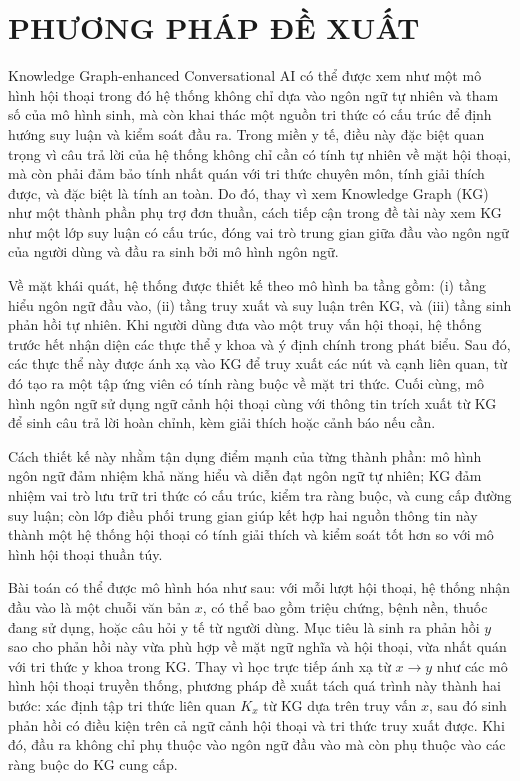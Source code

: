 \documentclass[conference]{IEEEtran}
\begin{document}
\section{PHƯƠNG PHÁP ĐỀ XUẤT}
Knowledge Graph-enhanced Conversational AI có thể được xem như một mô hình hội thoại trong đó hệ thống không chỉ dựa vào ngôn ngữ tự nhiên và tham số của mô hình sinh, mà còn khai thác một nguồn tri thức có cấu trúc để định hướng suy luận và kiểm soát đầu ra. Trong miền y tế, điều này đặc biệt quan trọng vì câu trả lời của hệ thống không chỉ cần có tính tự nhiên về mặt hội thoại, mà còn phải đảm bảo tính nhất quán với tri thức chuyên môn, tính giải thích được, và đặc biệt là tính an toàn. Do đó, thay vì xem Knowledge Graph (KG) như một thành phần phụ trợ đơn thuần, cách tiếp cận trong đề tài này xem KG như một lớp suy luận có cấu trúc, đóng vai trò trung gian giữa đầu vào ngôn ngữ của người dùng và đầu ra sinh bởi mô hình ngôn ngữ.

Về mặt khái quát, hệ thống được thiết kế theo mô hình ba tầng gồm: (i) tầng hiểu ngôn ngữ đầu vào, (ii) tầng truy xuất và suy luận trên KG, và (iii) tầng sinh phản hồi tự nhiên. Khi người dùng đưa vào một truy vấn hội thoại, hệ thống trước hết nhận diện các thực thể y khoa và ý định chính trong phát biểu. Sau đó, các thực thể này được ánh xạ vào KG để truy xuất các nút và cạnh liên quan, từ đó tạo ra một tập ứng viên có tính ràng buộc về mặt tri thức. Cuối cùng, mô hình ngôn ngữ sử dụng ngữ cảnh hội thoại cùng với thông tin trích xuất từ KG để sinh câu trả lời hoàn chỉnh, kèm giải thích hoặc cảnh báo nếu cần.

Cách thiết kế này nhằm tận dụng điểm mạnh của từng thành phần: mô hình ngôn ngữ đảm nhiệm khả năng hiểu và diễn đạt ngôn ngữ tự nhiên; KG đảm nhiệm vai trò lưu trữ tri thức có cấu trúc, kiểm tra ràng buộc, và cung cấp đường suy luận; còn lớp điều phối trung gian giúp kết hợp hai nguồn thông tin này thành một hệ thống hội thoại có tính giải thích và kiểm soát tốt hơn so với mô hình hội thoại thuần túy.

Bài toán có thể được mô hình hóa như sau: với mỗi lượt hội thoại, hệ thống nhận đầu vào là một chuỗi văn bản $x$, có thể bao gồm triệu chứng, bệnh nền, thuốc đang sử dụng, hoặc câu hỏi y tế từ người dùng. Mục tiêu là sinh ra phản hồi $y$ sao cho phản hồi này vừa phù hợp về mặt ngữ nghĩa và hội thoại, vừa nhất quán với tri thức y khoa trong KG. Thay vì học trực tiếp ánh xạ từ $x \rightarrow y$ như các mô hình hội thoại truyền thống, phương pháp đề xuất tách quá trình này thành hai bước: xác định tập tri thức liên quan $K_x$ từ KG dựa trên truy vấn $x$, sau đó sinh phản hồi có điều kiện trên cả ngữ cảnh hội thoại và tri thức truy xuất được. Khi đó, đầu ra không chỉ phụ thuộc vào ngôn ngữ đầu vào mà còn phụ thuộc vào các ràng buộc do KG cung cấp.
\end{document}
